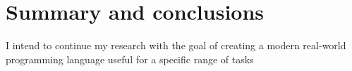 \chapter{Summary and conclusions}\label{chap:summary}
I intend to continue my research with the goal of creating a modern real-world programming language useful for a specific range of tasks
